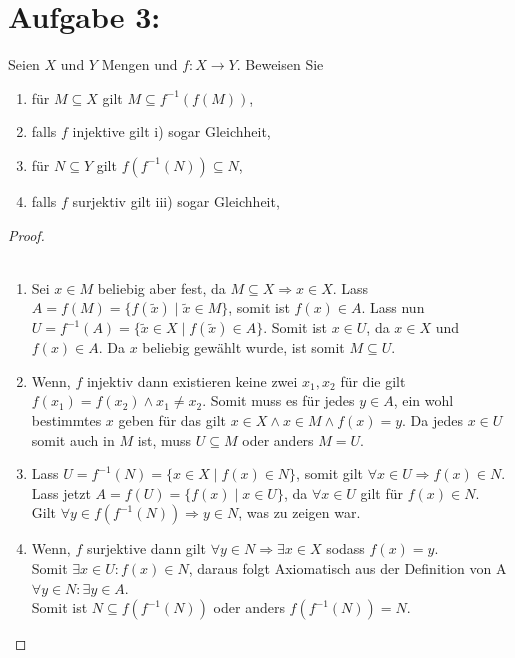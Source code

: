 \documentclass{exam}
\begin{document}
\section*{Aufgabe 3:}
Seien $X$ und $Y$ Mengen und $f : X \rightarrow Y$. Beweisen Sie
\begin{enumerate}[label=\roman*)]
	\item für $M \subseteq X$ gilt $M \subseteq f^{-1}(f(M))$,
	\item falls $f$ injektive gilt i) sogar Gleichheit,
	\item für $N \subseteq Y$ gilt $f(f^{-1}(N)) \subseteq N$,
	\item falls $f$ surjektiv gilt iii) sogar Gleichheit,
\end{enumerate}
\begin{proof} \\\
	\begin{enumerate}[label=\roman*)]
		\item
		      Sei $x \in M$ beliebig aber fest, da $M \subseteq X \Rightarrow x \in X$.
		      Lass $A = f(M) = \{f(\tilde{x}) \mid \tilde{x} \in M\}$, somit ist $f(x) \in A$.
		      Lass nun $U = f^{-1}(A) = \{\tilde{x} \in X \mid f(\tilde{x}) \in A\}$.
		      Somit ist $x \in U$, da $x \in X$ und $f(x) \in A$.
		      Da $x$ beliebig gewählt wurde, ist somit $M \subseteq U$. \checkmark
		\item
		      Wenn, $f$ injektiv dann existieren keine zwei $x_1, x_2$ für die gilt $f(x_1) = f(x_2) \land x_1 \not= x_2$.
		      Somit muss es für jedes $y \in A$, ein wohl bestimmtes $x$ geben für das gilt $x \in X \land x \in M \land f(x) = y$.
		      Da jedes $x \in U$ somit auch in $M$ ist, muss $U \subseteq M$ oder anders $M = U$. \checkmark
		\item
		      Lass $U = f^{-1}(N) = \{x \in X \mid f(x) \in N\}$, somit gilt $\forall x \in U \Rightarrow f(x) \in N$. \\
		      Lass jetzt $A = f(U) = \{f(x) \mid x \in U\}$, da $\forall x \in U$ gilt für $f(x) \in N$. \\
		      Gilt $\forall y \in f(f^{-1}(N)) \Rightarrow y \in N$, was zu zeigen war. \checkmark
		\item
		      Wenn, $f$ surjektive dann gilt $\forall y \in N \Rightarrow \exists x \in X$ sodass $f(x) = y$. \\
		      Somit $\exists x \in U: f(x) \in N$, daraus folgt Axiomatisch aus der Definition von A $\forall y \in N: \exists y \in A$.  \\
		      Somit ist $N \subseteq f(f^{-1}(N))$ oder anders $f(f^{-1}(N)) = N$. \checkmark
	\end{enumerate}
\end{proof}
\end{document}
